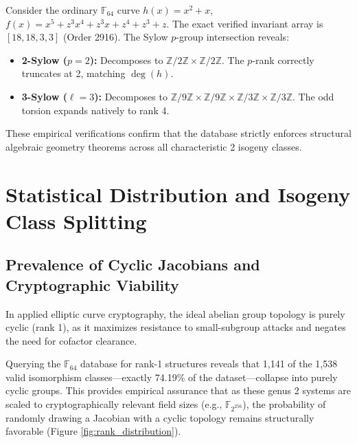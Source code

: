 \documentclass[letterpaper, 11pt]{article}
\begin{document}
Consider the ordinary $\mathbb{F}_{64}$ curve $h(x) = x^2 + x$, $f(x) = x^5 + z^3x^4 + z^3x + z^4 + z^3 + z$. The exact verified invariant array is $[18, 18, 3, 3]$ (Order 2916). The Sylow $p$-group intersection reveals:
\begin{itemize}
    \item \textbf{2-Sylow ($p=2$):} Decomposes to $\mathbb{Z}/2\mathbb{Z} \times \mathbb{Z}/2\mathbb{Z}$. The $p$-rank correctly truncates at 2, matching $\deg(h)$.
    \item \textbf{3-Sylow ($\ell = 3$):} Decomposes to $\mathbb{Z}/9\mathbb{Z} \times \mathbb{Z}/9\mathbb{Z} \times \mathbb{Z}/3\mathbb{Z} \times \mathbb{Z}/3\mathbb{Z}$. The odd torsion expands natively to rank 4.
\end{itemize}
These empirical verifications confirm that the database strictly enforces structural algebraic geometry theorems across all characteristic 2 isogeny classes.

\section{Statistical Distribution and Isogeny Class Splitting}

\subsection{Prevalence of Cyclic Jacobians and Cryptographic Viability}
In applied elliptic curve cryptography, the ideal abelian group topology is purely cyclic (rank 1), as it maximizes resistance to small-subgroup attacks and negates the need for cofactor clearance. 

Querying the $\mathbb{F}_{64}$ database for rank-1 structures reveals that 1,141 of the 1,538 valid isomorphism classes---exactly 74.19\% of the dataset---collapse into purely cyclic groups. This provides empirical assurance that as these genus 2 systems are scaled to cryptographically relevant field sizes (e.g., $\mathbb{F}_{2^{256}}$), the probability of randomly drawing a Jacobian with a cyclic topology remains structurally favorable (Figure \ref{fig:rank_distribution}).
\end{document}
